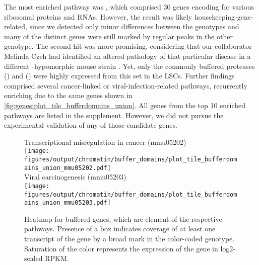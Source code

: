 The most enriched pathway was , which comprised \num{30} genes encoding for various ribosomal proteins and RNAs. However, the result was likely house\-keeping-gene-related, since we detected only minor differences between the genotypes and many of the distinct genes were still marked by regular \hisfourthree peaks in the other genotype. The second hit  was more promising, considering that our collaborator Melinda Czeh had identified an altered pathology of that particular disease in a different -hypomorphic mouse strain \mip. Yet, only the commonly buffered proteases  () and  () were highly expressed from this set in the \mllafnine LSCs. Further findings comprised several cancer-linked or viral-infection-related pathways, recurrently enriching due to the same genes shown in \autoref{fig:genes:plot_tile_bufferdomains_union}. All genes from the top \num{10} enriched pathways are listed in the supplement. However, we did not pursue the experimental validation of any of those candidate genes. 

\begin{figure}[!bth]
	\centering
 Transcriptional misregulation in cancer (mmu05202) \vspace{0.05em} \\
	\texttt{[image: figures/output/chromatin/buffer\_domains/plot\_tile\_bufferdomains\_union\_mmu05202.pdf]} 
	\vspace{0.1em}\\ 	Viral carcinogenesis (mmu05203) \vspace{0.05em} \\
	\texttt{[image: figures/output/chromatin/buffer\_domains/plot\_tile\_bufferdomains\_union\_mmu05203.pdf]} 
	\caption{Heatmap for buffered genes, which are element of the respective pathways. Presence of a box indicates coverage of at least one transcript of the gene by a broad \hisfourthree mark in the color-coded genotype. Saturation of the color represents the expression of the gene in log2-scaled RPKM.}
	\label{fig:genes:plot_tile_bufferdomains_union}
\end{figure}

 






